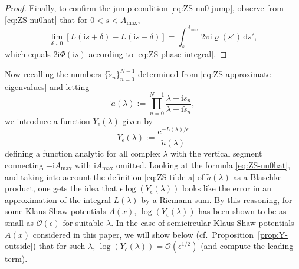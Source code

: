 \documentclass[12pt]{amsart}
\numberwithin{equation}{section}
\newcommand{\dd}{\mathrm{d}}
\newcommand{\ee}{\mathrm{e}}
\newcommand{\ii}{\mathrm{i}}
\newcommand{\SP}{\lambda}
\newcommand{\phaseint}{\Phi}
\newcommand{\evdensity}{\varrho}
\newcommand{\bigo}[1]{ \mathcal{O}\! \left( #1 \right) }
\begin{document}
\begin{proof}
Finally, to confirm the jump condition \eqref{eq:ZS-nu0-jump}, observe from \eqref{eq:ZS-nu0hat} that for $0<s<A_\mathrm{max}$,
\begin{equation}
\lim_{\delta\downarrow 0}\left[L(\ii s+\delta)-L(\ii s-\delta)\right]=
\int_s^{A_\mathrm{max}}2\pi \ii\evdensity(s')\,\dd s',
\end{equation}
which equals $2\ii\phaseint(\ii s)$ according to \eqref{eq:ZS-phase-integral}.
\end{proof}

Now recalling the numbers $\{\widetilde{s}_n\}_{n=0}^{N-1}$ determined from \eqref{eq:ZS-approximate-eigenvalues} and letting
\begin{equation}
\widetilde{a}(\SP):=\prod_{n=0}^{N-1}\frac{\SP-\ii\widetilde{s}_n}{\SP+\ii\widetilde{s}_n},
\label{eq:ZS-tilde-a}
\end{equation}
we introduce a function $Y_\epsilon(\SP)$ given by 
\begin{equation}
Y_\epsilon(\SP):=\frac{\ee^{-L(\SP)/\epsilon}}{\widetilde{a}(\SP)}
\label{eq:ZS-Y-define}
\end{equation}
defining a function analytic for all complex $\SP$ with the vertical segment connecting $-\ii A_\mathrm{max}$ with $\ii A_\mathrm{max}$ omitted.  
Looking at the formula \eqref{eq:ZS-nu0hat}, and taking into account the definition \eqref{eq:ZS-tilde-a} of $\widetilde{a}(\SP)$ as a Blaschke product, one gets the idea that $\epsilon\log(Y_\epsilon(\SP))$ looks like the error in an approximation of the integral $L(\SP)$ by a Riemann sum.
By this reasoning, for some Klaus-Shaw potentials $A(x)$, $\log(Y_\epsilon(\SP))$ has been shown to be as small as $\bigo{\epsilon}$ for suitable $\SP$.  In the case of  semicircular Klaus-Shaw potentials $A(x)$ considered in this paper, we will show below (cf.\ Proposition~\ref{prop:Y-outside}) that for such $\SP$, $\log(Y_\epsilon(\SP))=\bigo{\epsilon^{1/2}}$ (and compute the leading term).
\end{document}
